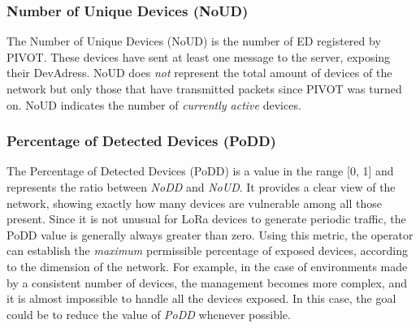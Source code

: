 \subsubsection{Number of Unique Devices (NoUD)}
The Number of Unique Devices (NoUD) is the number of ED registered by PIVOT. These devices have sent at least one message to the server, exposing their DevAdress. NoUD does \textit{not} represent the total amount of devices of the network but only those that have transmitted packets since PIVOT was turned on. NoUD indicates the number of \textit{currently active} devices.

\subsubsection{Percentage of Detected Devices (PoDD)}
The Percentage of Detected Devices (PoDD) is a value in the range [0, 1] and represents the ratio between \textit{NoDD} and \textit{NoUD}. It provides a clear view of the network, showing exactly how many devices are vulnerable among all those present. Since it is not unusual for LoRa devices to generate periodic traffic, the PoDD value is generally always greater than zero. Using this metric, the operator can establish the \textit{maximum} permissible percentage of exposed devices, according to the dimension of the network. For example, in the case of environments made by a consistent number of devices, the management becomes more complex, and it is almost impossible to handle all the devices exposed. In this case, the goal could be to reduce the value of \textit{PoDD} whenever possible.